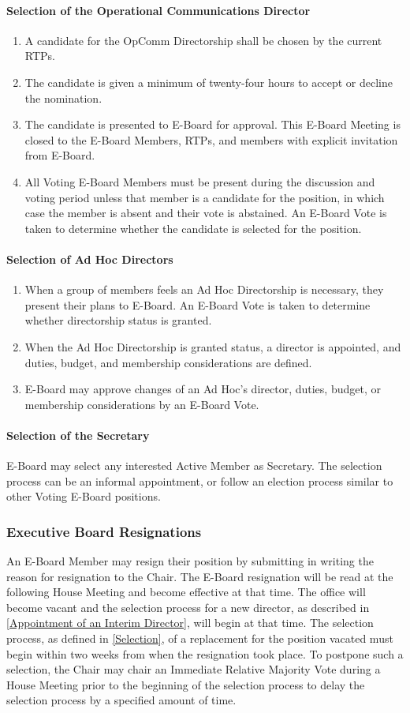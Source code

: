 \documentclass{article}
\newcommand{\asubsection}[1]{\subsubsection{#1} \label{#1}}
\newcommand{\asubsubsection}[1]{\paragraph{#1} \label{#1}}
\begin{document}
\asubsubsection{Selection of the Operational Communications Director}
\renewcommand{\theenumi}{\alph{enumi}} %

\begin{enumerate}
	\item A candidate for the OpComm Directorship shall be chosen by the current RTPs.
	\item The candidate is given a minimum of twenty-four hours to accept or decline the nomination.
	\item The candidate is presented to E-Board for approval.
	      This E-Board Meeting is closed to the E-Board Members, RTPs, and members with explicit invitation from E-Board.
	\item All Voting E-Board Members must be present during the discussion and voting period unless that member is a candidate for the position, in which case the member is absent and their vote is abstained.
	      An E-Board Vote is taken to determine whether the candidate is selected for the position.
\end{enumerate}

\asubsubsection{Selection of Ad Hoc Directors}
\begin{enumerate}
	\item When a group of members feels an Ad Hoc Directorship is necessary, they present their plans to E-Board.
	      An E-Board Vote is taken to determine whether directorship status is granted.
	\item When the Ad Hoc Directorship is granted status, a director is appointed, and duties, budget, and membership considerations are defined.
	\item E-Board may approve changes of an Ad Hoc's director, duties, budget, or membership considerations by an E-Board Vote.
\end{enumerate}

\asubsubsection{Selection of the Secretary}
E-Board may select any interested Active Member as Secretary.
The selection process can be an informal appointment, or follow an election process similar to other Voting E-Board positions.

\asubsection{Executive Board Resignations}
An E-Board Member may resign their position by submitting in writing the reason for resignation to the Chair.
The E-Board resignation will be read at the following House Meeting and become effective at that time.
The office will become vacant and the selection process for a new director, as described in \ref{Appointment of an Interim Director}, will begin at that time.
The selection process, as defined in \ref{Selection}, of a replacement for the position vacated must begin within two weeks from when the resignation took place.
To postpone such a selection, the Chair may chair an Immediate Relative Majority Vote during a House Meeting prior to the beginning of the selection process to delay the selection process by a specified amount of time.
\end{document}
